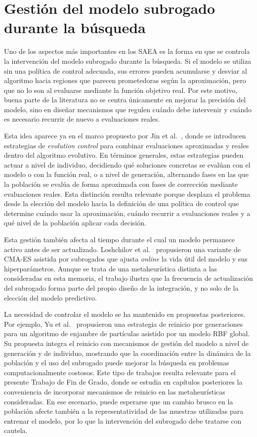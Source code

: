 \section{Gestión del modelo subrogado durante la búsqueda}
\label{sec:estado_gestion_modelo}

Uno de los aspectos más importantes en los SAEA es la forma en que se
controla la intervención del modelo subrogado durante la búsqueda. Si el
modelo se utiliza sin una política de control adecuada, sus errores pueden acumularse y
desviar al algoritmo hacia regiones que parecen prometedoras según la
aproximación, pero que no lo son al evaluarse mediante la función objetivo
real. Por este motivo, buena parte de la literatura no se centra únicamente en
mejorar la precisión del modelo, sino en diseñar mecanismos que regulen cuándo
debe intervenir y cuándo es necesario recurrir de nuevo a evaluaciones reales.

Esta idea aparece ya en el marco propuesto por Jin et al.~\cite{jin2002framework},
donde se introducen estrategias de \textit{evolution control} para combinar
evaluaciones aproximadas y reales dentro del algoritmo evolutivo. En términos
generales, estas estrategias pueden actuar a nivel de individuo, decidiendo qué
soluciones concretas se evalúan con el modelo o con la función real, o a nivel
de generación, alternando fases en las que la población se evalúa de forma
aproximada con fases de corrección mediante evaluaciones reales. Esta distinción resulta relevante porque desplaza el problema desde la elección
del modelo hacia la definición de una política de control que determine cuándo
usar la aproximación, cuándo recurrir a evaluaciones reales y a qué nivel de la
población aplicar cada decisión.

Esta gestión también afecta al tiempo durante el cual un modelo permanece
activo antes de ser actualizado. Loshchilov et
al.~\cite{loshchilov2012selfAdaptiveCMAES} propusieron una variante de CMA-ES
asistida por subrogados que ajusta \textit{online} la vida útil del modelo y
sus hiperparámetros. Aunque se trata de una metaheurística distinta a las
consideradas en esta memoria, el trabajo ilustra que la frecuencia de
actualización del subrogado forma parte del propio diseño de la integración, y
no solo de la elección del modelo predictivo.

La necesidad de controlar el modelo se ha mantenido en propuestas posteriores.
Por ejemplo, Yu et al.~\cite{yu2019restart} propusieron una estrategia de
reinicio por generaciones para un algoritmo de enjambre de partículas asistido
por un modelo RBF global. Su propuesta integra el reinicio con mecanismos de
gestión del modelo a nivel de generación y de individuo, mostrando que la
coordinación entre la dinámica de la población y el uso del subrogado puede
mejorar la búsqueda en problemas computacionalmente costosos. Este tipo de
trabajos resulta relevante para el presente Trabajo de Fin de Grado, donde se
estudia en capítulos posteriores la conveniencia de incorporar mecanismos de
reinicio en las metaheurísticas consideradas. En ese escenario, puede esperarse
que un cambio brusco en la población afecte también a la representatividad de
las muestras utilizadas para entrenar el modelo, por lo que la intervención del
subrogado debe tratarse con cautela.

